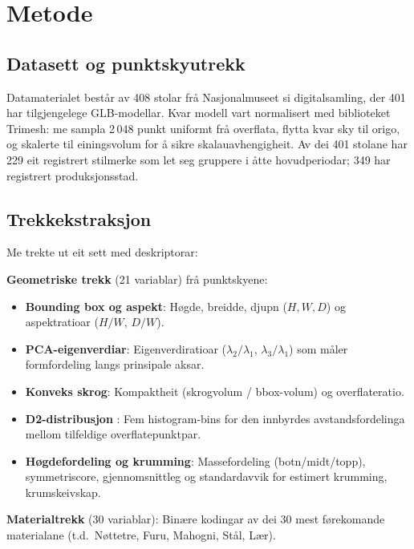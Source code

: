\documentclass[12pt,a4paper]{article}
\begin{document}
\section{Metode}

\subsection{Datasett og punktskyutrekk}

Datamaterialet best\aa{}r av 408 stolar fr\aa{} Nasjonalmuseet si digitalsamling, der 401 har tilgjengelege GLB-modellar. Kvar modell vart normalisert med biblioteket Trimesh: me sampla 2\,048 punkt uniformt fr\aa{} overflata, flytta kvar sky til origo, og skalerte til einingsvolum for \aa{} sikre skalauavhengigheit. Av dei 401 stolane har 229 eit registrert stilmerke som let seg gruppere i \aa{}tte hovudperiodar; 349 har registrert produksjonsstad.

\subsection{Trekkekstraksjon}

Me trekte ut eit sett med deskriptorar:

\textbf{Geometriske trekk} (21 variablar) fr\aa{} punktskyene:
\begin{itemize}
    \item \textbf{Bounding box og aspekt}: H\o{}gde, breidde, djupn ($H, W, D$) og aspektratioar ($H/W$, $D/W$).
    \item \textbf{PCA-eigenverdiar}: Eigenverdiratioar ($\lambda_2/\lambda_1$, $\lambda_3/\lambda_1$) som m\aa{}ler formfordeling langs prinsipale aksar.
    \item \textbf{Konveks skrog}: Kompaktheit (skrogvolum / bbox-volum) og overflateratio.
    \item \textbf{D2-distribusjon} \citep{osada2002shape}: Fem histogram-bins for den innbyrdes avstandsfordelinga mellom tilfeldige overflatepunktpar.
    \item \textbf{H\o{}gdefordeling og krumming}: Massefordeling (botn/midt/topp), symmetriscore, gjennomsnittleg og standardavvik for estimert krumming, krumskeivskap.
\end{itemize}

\textbf{Materialtrekk} (30 variablar): Bin\ae{}re kodingar av dei 30 mest f\o{}rekomande materialane (t.d.\ N\o{}ttetre, Furu, Mahogni, St\aa{}l, L\ae{}r).
\end{document}
